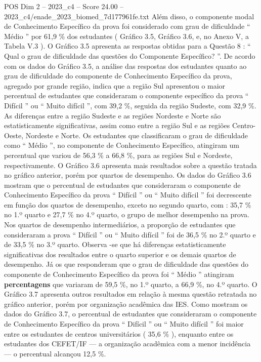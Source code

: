 \begin{textsample}{POS Dim 2 – 2023\_c4 – Score 24.00 – 2023\_c4/enade\_2023\_biomed\_7d177961fe.txt}
Além disso, o componente modal de Conhecimento Específico da prova foi considerado com grau de dificuldade “ Médio ” por 61,9 \% dos estudantes ( Gráfico 3.5, Gráfico 3.6, e, no Anexo V, a Tabela V.3 ).
O Gráfico 3.5 apresenta as respostas obtidas para a Questão 8 : “ Qual o grau de dificuldade das questões do Componente Específico? ”.
De acordo com os dados do Gráfico 3.5, a análise das respostas dos estudantes quanto ao grau de dificuldade do componente de Conhecimento Específico da prova, agregado por grande região, indica que a região Sul apresentou o maior percentual de estudantes que consideraram o componente específico da prova “ Difícil ” ou “ Muito difícil ”, com 39,2 \%, seguida da região Sudeste, com 32,9 \%.
As diferenças entre a região Sudeste e as regiões Nordeste e Norte são estatisticamente significativas, assim como entre a região Sul e as regiões Centro-Oeste, Nordeste e Norte.
Os estudantes que classificaram o grau de dificuldade como “ Médio ”, no componente de Conhecimento Específico, atingiram um percentual que variou de 56,3 \% a 66,8 \%, para as regiões Sul e Nordeste, respectivamente.
O Gráfico 3.6 apresenta mais resultados sobre a questão tratada no gráfico anterior, porém por quartos de desempenho.
Os dados do Gráfico 3.6 mostram que o percentual de estudantes que consideraram o componente de Conhecimento Específico da prova “ Difícil ” ou “ Muito difícil ” foi decrescente em função dos quartos de desempenho, exceto no segundo quarto, com : 35,7 \% no 1.º quarto e 27,7 \% no 4.º quarto, o grupo de melhor desempenho na prova.
Nos quartos de desempenho intermediários, a proporção de estudantes que consideraram a prova “ Difícil ” ou “ Muito difícil ” foi de 36,5 \% no 2.º quarto e de 33,5 \% no 3.º quarto.
Observa -se que há diferenças estatisticamente significativas dos resultados entre o quarto superior e os demais quartos de desempenho.
Já os que responderam que o grau de dificuldade das questões do componente de Conhecimento Específico da prova foi “ Médio ” atingiram \textbf{percentagens} que variaram de 59,5 \%, no 1.º quarto, a 66,9 \%, no 4.º quarto.
O Gráfico 3.7 apresenta outros resultados em relação à mesma questão retratada no gráfico anterior, porém por organização acadêmica das IES.
Como mostram os dados do Gráfico 3.7, o percentual de estudantes que consideraram o componente de Conhecimento Específico da prova “ Difícil ” ou “ Muito difícil ” foi maior entre os estudantes de centros universitários ( 35,6 \% ), enquanto entre os estudantes dos CEFET/IF — a organização acadêmica com a menor incidência — o percentual alcançou 12,5 \%.

\end{textsample}
